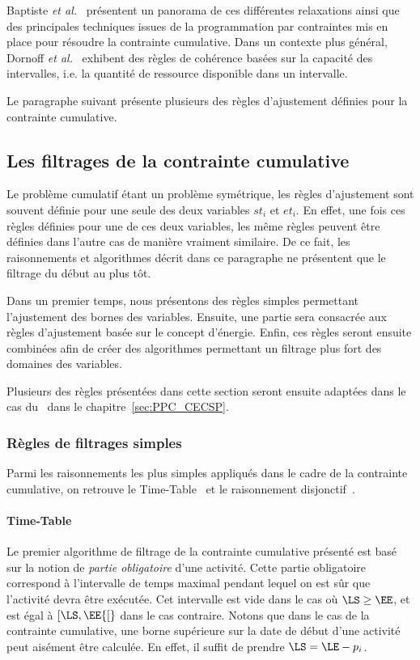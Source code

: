 Baptiste {\it et al.}~\cite{BLPN} présentent un panorama de ces
différentes relaxations ainsi que des principales techniques issues de
la programmation par contraintes mis en place pour résoudre la
contrainte cumulative. Dans un contexte plus général, Dornoff {\it et
al.}~\cite{DHP} exhibent des règles de cohérence basées sur la
capacité des intervalles, i.e. la quantité de ressource disponible
dans un intervalle.

Le paragraphe suivant présente plusieurs des règles d'ajustement
définies pour la contrainte cumulative. 


\subsection{Les filtrages de la contrainte cumulative}
\label{sec:cumu_propag}

Le problème cumulatif étant un problème symétrique, les règles
d'ajustement sont souvent définie pour une seule des deux variables
$st_i$ et $et_i$. En effet, une fois ces règles définies pour une de
ces deux variables, les même règles peuvent être définies dans l'autre
cas de manière vraiment similaire. De ce fait, les raisonnements et
algorithmes décrit dans ce paragraphe ne présentent que le filtrage du
début au plus tôt.

Dans un premier temps, nous présentons des règles simples permettant
l'ajustement des bornes des variables. Ensuite, une partie sera
consacrée aux règles d'ajustement basée sur le concept
d'énergie. Enfin, ces règles seront ensuite combinées afin de créer
des algorithmes permettant un filtrage plus fort des domaines des
variables.

Plusieurs des règles présentées dans cette section seront ensuite
adaptées dans le cas du \CECSP~dans le chapitre~\ref{sec:PPC_CECSP}.

\subsubsection{Règles de filtrages simples}

Parmi les raisonnements les plus simples appliqués dans le cadre de la
contrainte cumulative, on retrouve le Time-Table~\cite{TTLah} et le
raisonnement disjonctif~\cite{BLPN}.  

\paragraph{Time-Table}
Le premier algorithme de filtrage de la contrainte cumulative
présenté est basé sur la notion de {\it partie obligatoire} d'une
activité. Cette partie obligatoire correspond à l'intervalle de temps
maximal pendant lequel on est sûr que l'activité devra être
exécutée. Cet intervalle est vide dans le cas où $\LS \ge \EE$, et est
égal à $[\LS,\EE{[}$ dans le cas contraire. Notons que dans le cas de la
contrainte cumulative, une borne supérieure sur la date de début d'une
activité peut aisément être calculée. En effet, il suffit de prendre
$\LS=\LE - p_i$. 


